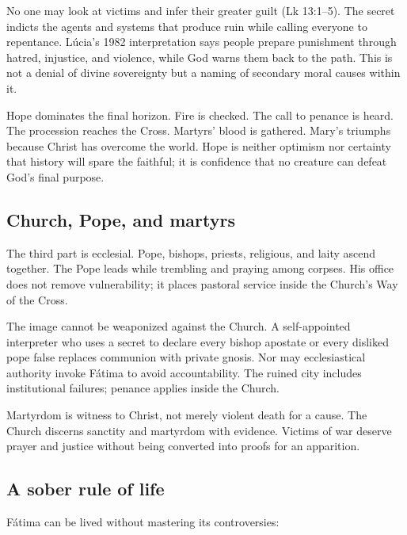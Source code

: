 No one may look at victims and infer their greater guilt (Lk 13:1--5). The secret indicts the agents and systems that produce ruin while calling everyone to repentance. Lúcia's 1982 interpretation says people prepare punishment through hatred, injustice, and violence, while God warns them back to the path. This is not a denial of divine sovereignty but a naming of secondary moral causes within it.

Hope dominates the final horizon. Fire is checked. The call to penance is heard. The procession reaches the Cross. Martyrs' blood is gathered. Mary's  triumphs because Christ has overcome the world. Hope is neither optimism nor certainty that history will spare the faithful; it is confidence that no creature can defeat God's final purpose.

\subsection{Church, Pope, and martyrs}

The third part is ecclesial. Pope, bishops, priests, religious, and laity ascend together. The Pope leads while trembling and praying among corpses. His office does not remove vulnerability; it places pastoral service inside the Church's Way of the Cross.

The image cannot be weaponized against the Church. A self-appointed interpreter who uses a secret to declare every bishop apostate or every disliked pope false replaces communion with private gnosis. Nor may ecclesiastical authority invoke Fátima to avoid accountability. The ruined city includes institutional failures; penance applies inside the Church.

Martyrdom is witness to Christ, not merely violent death for a cause. The Church discerns sanctity and martyrdom with evidence. Victims of war deserve prayer and justice without being converted into proofs for an apparition.

\subsection{A sober rule of life}

Fátima can be lived without mastering its controversies:

